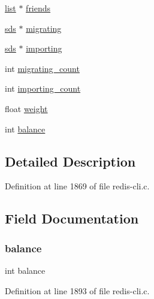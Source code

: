 \begin{DoxyCompactItemize}
\item 
\hyperlink{structlist}{list} $\ast$ \hyperlink{structcluster_manager_node_ae23d28d899b0e45974609c4ac7f1ea8f}{friends}
\item 
\hyperlink{sds_8h_ad69abac3df4532879db9642c95f5ef6f}{sds} $\ast$ \hyperlink{structcluster_manager_node_a604c80c491c9223758b948b037f86c71}{migrating}
\item 
\hyperlink{sds_8h_ad69abac3df4532879db9642c95f5ef6f}{sds} $\ast$ \hyperlink{structcluster_manager_node_a5a772e4c6ce0e8c19238f6e054e7c277}{importing}
\item 
int \hyperlink{structcluster_manager_node_af1e54163cd1ecf546c6ccd63a4be9caa}{migrating\+\_\+count}
\item 
int \hyperlink{structcluster_manager_node_a25436798b02625247a3e5dd2625c4e96}{importing\+\_\+count}
\item 
float \hyperlink{structcluster_manager_node_a8128625c9e3fd04c27b82957732d8781}{weight}
\item 
int \hyperlink{structcluster_manager_node_ac794434112478f3134ad93778a0f2860}{balance}
\end{DoxyCompactItemize}


\subsection{Detailed Description}


Definition at line 1869 of file redis-\/cli.\+c.



\subsection{Field Documentation}
\mbox{\label{structcluster_manager_node_ac794434112478f3134ad93778a0f2860}} 
\subsubsection{\texorpdfstring{balance}{balance}}
{\footnotesize\ttfamily int balance}



Definition at line 1893 of file redis-\/cli.\+c.

\mbox{\label{structcluster_manager_node_ace869d36dc1b4de4b6d046c0c71486cb}} 
